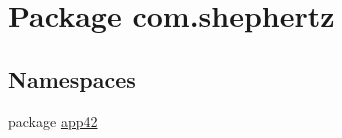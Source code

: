 \hypertarget{namespacecom_1_1shephertz}{\section{Package com.\+shephertz}
\label{namespacecom_1_1shephertz}
}
\subsection*{Namespaces}
\begin{DoxyCompactItemize}
\item 
package \hyperlink{namespacecom_1_1shephertz_1_1app42}{app42}
\end{DoxyCompactItemize}

